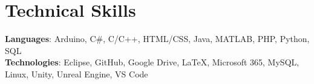 \section{Technical Skills}
    \begin{itemize}[leftmargin=0.15in, label={}]
	\small{\item{
		\textbf{Languages}{: Arduino, C\#, C/C++, HTML/CSS, Java, MATLAB, PHP, Python, SQL} \\
		\textbf{Technologies}{: Eclipse, GitHub, Google Drive, LaTeX, Microsoft 365, MySQL, Linux, Unity, Unreal Engine, VS Code} \\
	}}
    \end{itemize}
